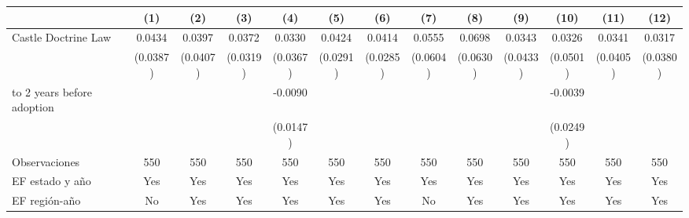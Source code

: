 {
\def\sym#1{\ifmmode^{#1}\else\(^{#1}\)\fi}
\begin{tabular}{l*{12}{c}}
\toprule
                    &\multicolumn{1}{c}{(1)}         &\multicolumn{1}{c}{(2)}         &\multicolumn{1}{c}{(3)}         &\multicolumn{1}{c}{(4)}         &\multicolumn{1}{c}{(5)}         &\multicolumn{1}{c}{(6)}         &\multicolumn{1}{c}{(7)}         &\multicolumn{1}{c}{(8)}         &\multicolumn{1}{c}{(9)}         &\multicolumn{1}{c}{(10)}         &\multicolumn{1}{c}{(11)}         &\multicolumn{1}{c}{(12)}         \\
\midrule
Castle Doctrine Law &      0.0434         &      0.0397         &      0.0372         &      0.0330         &      0.0424         &      0.0414         &      0.0555         &      0.0698         &      0.0343         &      0.0326         &      0.0341         &      0.0317         \\
                    &    (0.0387)         &    (0.0407)         &    (0.0319)         &    (0.0367)         &    (0.0291)         &    (0.0285)         &    (0.0604)         &    (0.0630)         &    (0.0433)         &    (0.0501)         &    (0.0405)         &    (0.0380)         \\
\addlinespace
0 to 2 years before adoption&                     &                     &                     &     -0.0090         &                     &                     &                     &                     &                     &     -0.0039         &                     &                     \\
                    &                     &                     &                     &    (0.0147)         &                     &                     &                     &                     &                     &    (0.0249)         &                     &                     \\
\midrule
Observaciones       &         550         &         550         &         550         &         550         &         550         &         550         &         550         &         550         &         550         &         550         &         550         &         550         \\
EF estado y año     &         Yes         &         Yes         &         Yes         &         Yes         &         Yes         &         Yes         &         Yes         &         Yes         &         Yes         &         Yes         &         Yes         &         Yes         \\
EF región-año       &          No         &         Yes         &         Yes         &         Yes         &         Yes         &         Yes         &          No         &         Yes         &         Yes         &         Yes         &         Yes         &         Yes         \\

\end{tabular}}
